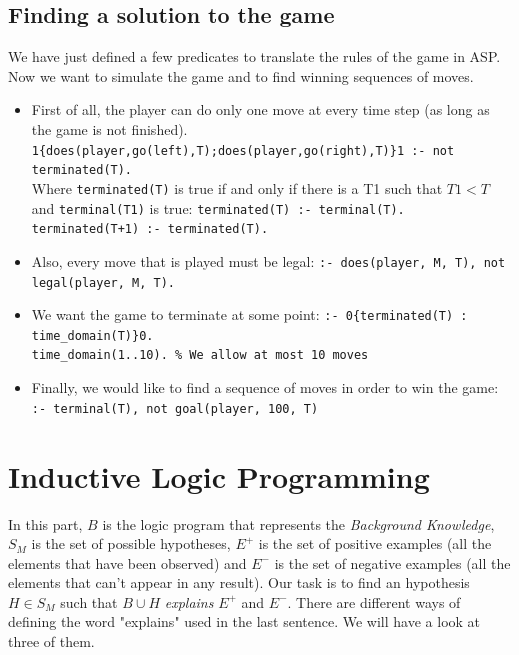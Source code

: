 \subsection{Finding a solution to the game}

We have just defined a few predicates to translate the rules of the game in ASP. Now we want to simulate the game and to find winning sequences of moves.
\begin{itemize}
\item First of all, the player can do only one move at every time step (as long as the game is not finished).\newline
\texttt{1\{does(player,go(left),T);does(player,go(right),T)\}1 :- not terminated(T).}\\
Where \texttt{terminated(T)} is true if and only if there is a T1 such that $T1<T$ and \texttt{terminal(T1)} is true:\newline
\texttt{terminated(T) :- terminal(T).}  \\
\texttt{terminated(T+1) :- terminated(T).}

\item Also, every move that is played must be legal:\newline
\texttt{:- does(player, M, T), not legal(player, M, T).}

\item We want the game to terminate at some point:\newline
\texttt{:- 0\{terminated(T) : time\_domain(T)\}0.}\\
\texttt{time\_domain(1..10). \% We allow at most 10 moves} 

\item Finally, we would like to find a sequence of moves in order to win the game:\newline
\texttt{:- terminal(T), not goal(player, 100, T)}

\end{itemize}

\section{Inductive Logic Programming}

In this part, $B$ is the logic program that represents the \textit{Background Knowledge}, $S_M$ is the set of possible hypotheses, $E^+$ is the set of positive examples (all the elements that have been observed) and $E^-$ is the set of negative examples (all the elements that can't appear in any result). Our task is to find an hypothesis $H\in S_M$ such that $B\cup H$ \textit{explains} $E^+$ and $E^-$. There are different ways of defining the word "explains" used in the last sentence. We will have a look at three of them.

